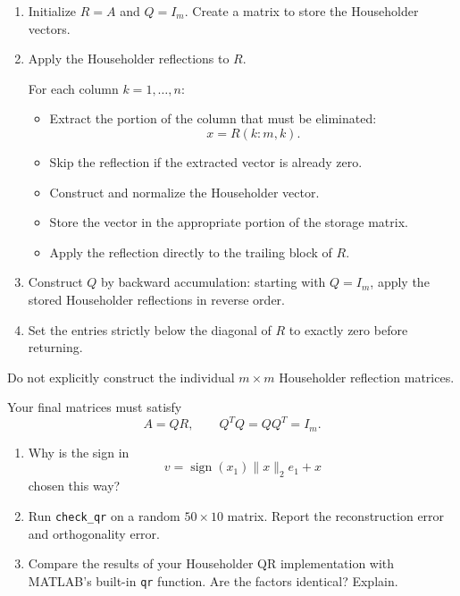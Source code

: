 \documentclass{ximera}
\begin{document}
\begin{enumerate}
    \item Initialize $R=A$ and $Q=I_m$. Create a matrix to
    store the Householder vectors.

    \item Apply the Householder reflections to $R$.

    For each column $k=1,\ldots,n$:

    \begin{itemize}
        \item Extract the portion of the column that must be
        eliminated:
        \[
        x=R(k:m,k).
        \]

        \item Skip the reflection if the extracted vector is
        already zero.

        \item Construct and normalize the Householder vector.

        \item Store the vector in the appropriate portion of
        the storage matrix.

        \item Apply the reflection directly to the trailing
        block of $R$.
    \end{itemize}

    \item Construct $Q$ by backward accumulation: starting with
    $Q=I_m$, apply the stored Householder reflections in reverse
    order.

    \item Set the entries strictly below the diagonal of $R$
    to exactly zero before returning.
\end{enumerate}

Do not explicitly construct the individual $m\times m$
Householder reflection matrices.

Your final matrices must satisfy
\[
A=QR,\qquad Q^TQ=QQ^T=I_m.
\]

\begin{exercise}

\begin{enumerate}
    \item Why is the sign in
    \[
    v=\operatorname{sign}(x_1)\|x\|_2e_1+x
    \]
    chosen this way?

    \item Run \texttt{check\_qr} on a random $50\times10$ matrix.
    Report the reconstruction error and orthogonality error.

    \item Compare the results of your Householder QR
    implementation with MATLAB's built-in \texttt{qr}
    function. Are the factors identical? Explain.
\end{enumerate}

\end{exercise}
\end{document}
